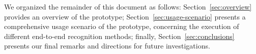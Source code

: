 We organized the remainder of this document as follows: Section~\ref{sec:overview} provides an overview of the prototype; Section~\ref{sec:usage-scenario} presents a comprehensive usage scenario of the prototype, concerning the execution of different end-to-end recognition methods; finally, Section~\ref{sec:conclusions} presents our final remarks and directions for future investigations.